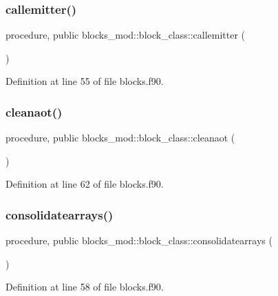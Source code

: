 \subsubsection{\texorpdfstring{callemitter()}{callemitter()}}
{\footnotesize\ttfamily procedure, public blocks\+\_\+mod\+::block\+\_\+class\+::callemitter (\begin{DoxyParamCaption}{ }\end{DoxyParamCaption})}



Definition at line 55 of file blocks.\+f90.

\mbox{\label{structblocks__mod_1_1block__class_ab58da434b2813d158b3f688d3c60d02c}} 
\subsubsection{\texorpdfstring{cleanaot()}{cleanaot()}}
{\footnotesize\ttfamily procedure, public blocks\+\_\+mod\+::block\+\_\+class\+::cleanaot (\begin{DoxyParamCaption}{ }\end{DoxyParamCaption})}



Definition at line 62 of file blocks.\+f90.

\mbox{\label{structblocks__mod_1_1block__class_a68f5bb0cb32b5b51cffd66d472cc45f0}} 
\subsubsection{\texorpdfstring{consolidatearrays()}{consolidatearrays()}}
{\footnotesize\ttfamily procedure, public blocks\+\_\+mod\+::block\+\_\+class\+::consolidatearrays (\begin{DoxyParamCaption}{ }\end{DoxyParamCaption})}



Definition at line 58 of file blocks.\+f90.

